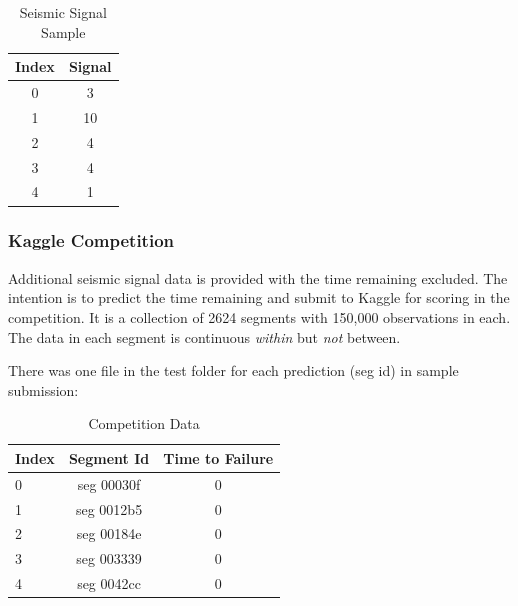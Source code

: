 \documentclass[]{llncs}
\begin{document}
\begin{table}[h!]
	\begin{center}
		\caption{Seismic Signal Sample}
		\label{tab:table1}
		\begin{tabular}{c|c} %
			\textbf{Index} & \textbf{Signal}\\
			\hline
			0 & 3 \\
			1 & 10 \\ 
			2 & 4 \\
			3 & 4 \\
			4 & 1 \\
		\end{tabular}
	\end{center}
\end{table}

\subsubsection{Kaggle Competition} Additional seismic signal data is provided with the time remaining excluded. The intention is to predict the time remaining and submit to Kaggle for scoring in the competition\cite{kaggle}. It is a collection of 2624 segments with 150,000 observations in each. The data in each segment is continuous {\em within} but {\em not} between.\par

There was one file in the test folder for each prediction (seg id) in sample submission: \par
\begin{table}[h!]
	\begin{center}
		\caption{Competition Data}
		\label{tab:table1}
		\begin{tabular}{l|c|c} %
			\textbf{Index} & \textbf{Segment Id} & \textbf{Time to Failure}\\
			\hline
			0 & seg 00030f & 0 \\ 
			1 & seg 0012b5 & 0 \\ 
			2 & seg 00184e & 0 \\ 
			3 & seg 003339 & 0 \\ 
			4 & seg 0042cc & 0 \\ 
		\end{tabular}
	\end{center}
\end{table}
\end{document}
